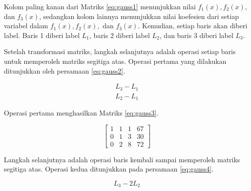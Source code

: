 Kolom paling kanan dari Matriks \ref{eq:gauss1} menunjukkan nilai \begin{math}f_1(x), f_2(x),\end{math} dan \begin{math}f_3(x)\end{math}, sedangkan kolom lainnya menunjukkan nilai koefesien dari setiap variabel dalam \begin{math}f_1(x), f_2(x),\end{math} dan \begin{math}f_3(x)\end{math}. Kemudian, setiap baris akan diberi label. Baris 1 diberi label \begin{math}L_1\end{math}, baris 2 diberi label \begin{math}L_2\end{math}, dan baris 3 diberi label \begin{math}L_3\end{math}.

Setelah transformasi matriks, langkah selanjutnya adalah operasi setiap baris untuk memperoleh matriks segitiga atas. Operasi pertama yang dilakukan ditunjukkan oleh persamaan \ref{eq:gauss2}.

\begin{gather}
	L_3 - L_1 \nonumber \\
	L_2 - L_1 \label{eq:gauss2}
\end{gather}

Operasi pertama menghasilkan Matriks \ref{eq:gauss3}.

\begin{center}
	\setlength\arraycolsep{10pt}
	\begin{equation}
		\begin{bmatrix}
				1 	& 1 	& 1 	& 67 		\\[1em]
				0 	& 1 	& 3 	& 30 		\\[1em]
				0 	& 2 	& 8 	& 72
		\end{bmatrix}
		\label{eq:gauss3}
	\end{equation}
\end{center}

Langkah selanjutnya adalah operasi baris kembali sampai memperoleh matriks segitiga atas. Operasi kedua ditunjukkan pada persamaan \ref{eq:gauss4}.

\begin{equation}
	L_3 - 2L_2 \label{eq:gauss4}
\end{equation}

